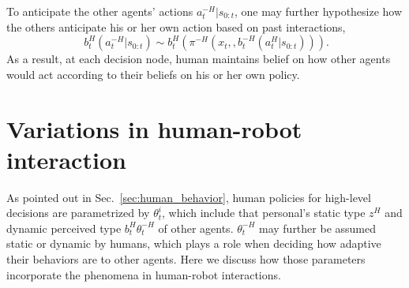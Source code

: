 \documentclass[letterpaper, 10 pt, conference]{ieeeconf}  %
\begin{document}
To anticipate the other agents' actions $a^{-H}_{t}|s_{0:t}$, one may further 
hypothesize how the others anticipate his or her own action based on past 
interactions, 
\begin{equation}~\label{eq:human_decision2}
b^H_t(a^{-H}_{t}|s_{0:t}) \sim  b^H_t(\pi^{-H} (x_t, ,b_{t}^{-H}(a^H_{t}|s_{0:t}))).
\end{equation}
As a result, at each decision node, human maintains belief on how other agents 
would act according to their beliefs on his or her own policy.


\section{Variations in human-robot interaction}
As pointed out in Sec.~\ref{sec:human_behavior}, human policies for high-level 
decisions are parametrized by $\theta^i_t$, which include that personal's static 
type $z^H$ and dynamic perceived type $b^H_t{\theta^{-H}_t}$ of other agents. 
$\theta^{-H}_t$ may further be assumed static or dynamic by humans, which 
plays a role when deciding how adaptive their behaviors are to other agents. 
Here we discuss how those parameters incorporate the 
phenomena in human-robot interactions. 
\end{document}
